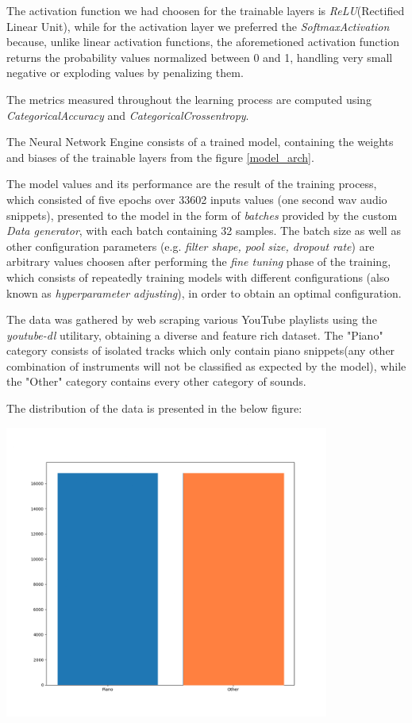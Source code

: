 The activation function we had choosen for the trainable layers is \textit{ReLU}(Rectified Linear Unit), while for
the activation layer we preferred the \textit{SoftmaxActivation} because, unlike linear activation functions,
the aforemetioned activation function returns the probability values normalized between 0 and 1, handling
very small negative or exploding values by penalizing them.


The metrics measured throughout the learning process are computed using \textit{CategoricalAccuracy} and
\textit{CategoricalCrossentropy}.




The Neural Network Engine consists of a trained model, containing the weights and biases of the trainable layers from
the figure \ref{model_arch}.

The model values and its performance are the result of the training process, which consisted of five epochs over 33602
inputs values (one second wav audio snippets), presented to the model in the form of \textit{batches} provided
by the custom \textit{Data generator}, with each batch containing 32 samples. The batch size as well as other
configuration parameters (e.g. \textit{filter shape, pool size, dropout rate}) are arbitrary values choosen
after performing the \textit{fine tuning} phase of the training, which consists of repeatedly training models with
different configurations (also known as \textit{hyperparameter adjusting}), in order to obtain an optimal configuration.


The data was gathered by web scraping various YouTube playlists using the \textit{youtube-dl} utilitary, obtaining a
diverse and feature rich dataset.
The "Piano" category consists of isolated tracks which only contain piano snippets(any other combination of instruments
will not be classified as expected by the model), while the "Other" category contains every other category of sounds.

The distribution of the data is presented in the below figure:

\begin{center}
	\includegraphics[width = 4.2in]{images/datadistr.png}
	\centerline{}
\label{dd}
\end{center}

